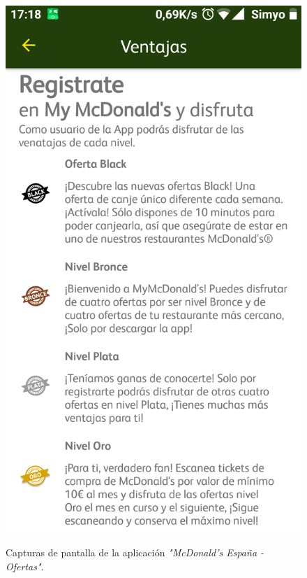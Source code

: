 \documentclass[twoside]{report}
\begin{document}
\begin{figure}[H]
\begin{center}
\includegraphics[scale=0.10]{images/restaurantes/mcdo3.png}
\caption{Capturas de pantalla de la aplicación \textit{"McDonald's España - Ofertas"}.} \cite{mcdo}
\end{center}
\end{figure}
\end{document}
